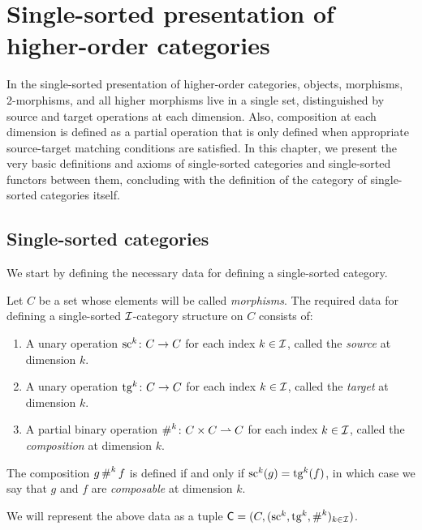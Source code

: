\chapter[Single-sorted presentation]{Single-sorted presentation of higher-order categories}
\label{ch:single_sorted}

In the single-sorted presentation of higher-order categories, objects, morphisms, 2-morphisms, and
all higher morphisms live in a single set, distinguished by source and target operations at each
dimension. Also, composition at each dimension is defined as a partial operation that is only
defined when appropriate source-target matching conditions are satisfied. In this chapter, we
present the very basic definitions and axioms of single-sorted categories and single-sorted functors
between them, concluding with the definition of the category of single-sorted categories itself.

\section{Single-sorted categories}

We start by defining the necessary data for defining a single-sorted category.

\begin{definition}
  \label{def:SingleSortedCategoryStruct}
  \leanok
  Let $C$ be a set whose elements will be called \emph{morphisms}. The required data for defining a
  single-sorted $\mathcal{I}$-category structure on $C$ consists of:

  \begin{enumerate}
    \item \label{ax:ss_sc} A unary operation $\operatorname{sc}^k \colon C \to C$ for each index $k \in \mathcal{I}$,
      called the \emph{source} at dimension $k$.
    \item \label{ax:ss_tg} A unary operation $\operatorname{tg}^k \colon C \to C$ for each index $k \in \mathcal{I}$,
      called the \emph{target} at dimension $k$.
    \item \label{ax:ss_comp} A partial binary operation $\operatorname{\#}^k \colon C \times C \rightharpoonup
      C$ for each index $k \in \mathcal{I}$, called the \emph{composition} at dimension $k$.
  \end{enumerate}

  The composition $g \operatorname{\#}^k f$ is defined if and only if $\operatorname{sc}^k (g) = \operatorname{tg}^k (f)$, in which case we
  say that $g$ and $f$ are \emph{composable} at dimension $k$.

  We will represent the above data as a tuple $\mathsf{C} = (C, (\operatorname{sc}^k, \operatorname{tg}^k, \operatorname{\#}^k)_{k \in
  \mathcal{I}})$.
\end{definition}

